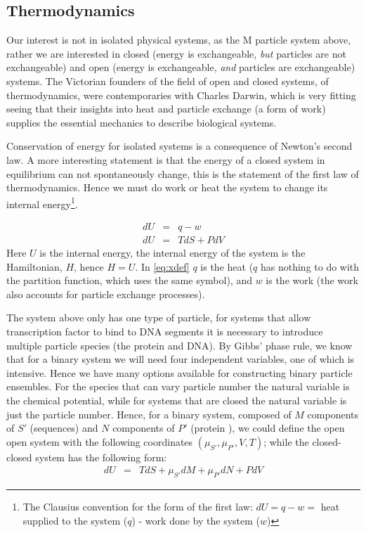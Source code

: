 
\subsection{Thermodynamics}
Our interest is not in isolated physical systems, as the M particle system above, rather we are interested in closed (energy is exchangeable, \textit{but} particles are not exchangeable) and open (energy is exchangeable, \textit{and} particles are exchangeable) systems.  The Victorian founders of the field of open and closed systems, of thermodynamics, were contemporaries with Charles Darwin, which is very fitting seeing that their insights into heat and particle exchange (a form of work) supplies the essential mechanics to describe biological systems.

Conservation of energy for isolated systems is a consequence of Newton's second law. A more interesting statement is that the energy of a closed system in equilibrium can not spontaneously change, this is the statement of the first law of thermodynamics.  Hence we must do work or heat the system to change its internal energy\footnote{The Clausius convention for the form of the first law: $dU = q -w =$ heat supplied to the system ($q$) - work done by the system ($w$)}. 

\begin{eqnarray}
  dU &=& q - w \label{eq:xdef} \\  \nonumber
  dU &=& TdS + PdV
\end{eqnarray}
 Here $U$ is the internal energy, the internal energy of the system is the Hamiltonian, $H$, hence $H=U$.  In \eqref{eq:xdef} $q$ is the heat ($q$ has nothing to do with the partition function, which uses the same symbol), and $w$ is the work (the work also accounts for particle exchange processes).    
      
 The system above only has one type of particle, for systems that allow transcription factor to bind to DNA segments it is necessary to introduce multiple particle species (the protein and DNA).  By Gibbs' phase rule, we know that for a binary system we will need four independent variables, one of which is intensive.  Hence we have many options available for constructing binary particle ensembles.  For the species that can vary particle number the natural variable is the chemical potential, while for systems that are closed the natural variable is just the particle number.  Hence, for a binary system, composed of $M$ components of $S'$ (sequences) and $N$ components of $P'$ (protein ), we could define the open open system with the following coordinates $( \mu_{S'}, \mu_{P'},V,T)$; while the closed-closed system has the following form:
   \begin{eqnarray}
  dU &=& TdS + \mu_{S'} dM + \mu_{P'} dN + PdV
\end{eqnarray}\label{closedclosed} 
%
  
